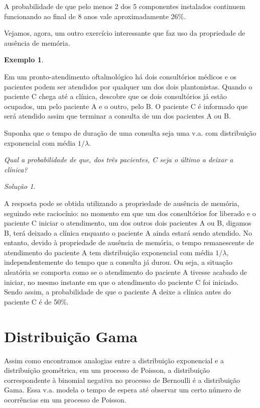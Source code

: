 \documentclass[
]{book}
\theoremstyle{definition}
\theoremstyle{definition}
\newtheorem{example}{Exemplo}[chapter]
\theoremstyle{definition}
\theoremstyle{remark}
\newtheorem*{solution}{Solução}
\begin{document}
A probabilidade de que pelo menos 2 dos 5 componentes instalados continuem funcionando ao final de 8 anos vale aproximadamente 26\%.

Vejamos, agora, um outro exercício interessante que faz uso da propriedade de ausência de memória.

\begin{example}
\protect\hypertarget{exm:unnamed-chunk-7}{}{\label{exm:unnamed-chunk-7} }
\end{example}

Em um pronto-atendimento oftalmológico há dois consultórios médicos e os pacientes podem ser atendidos por qualquer um dos dois plantonistas. Quando o paciente C chega até a clínica, descobre que os dois consultórios já estão ocupados, um pelo paciente A e o outro, pelo B. O paciente C é informado que será atendido assim que terminar a consulta de um dos pacientes A ou B.

Suponha que o tempo de duração de uma consulta seja uma v.a. com distribuição exponencial com média \(1/\lambda\).

\emph{Qual a probabilidade de que, dos três pacientes, C seja o último a deixar a clínica?}

\begin{solution}
{}
\end{solution}

A resposta pode se obtida utilizando a propriedade de ausência de memória, seguindo este raciocínio: no momento em que um dos consultórios for liberado e o paciente C iniciar o atendimento, um dos outros dois pacientes A ou B, digamos B, terá deixado a clínica enquanto o paciente A ainda estará sendo atendido. No entanto, devido à propriedade de ausência de memória, o tempo remanescente de atendimento do paciente A tem distribuição exponencial com média \(1/\lambda\), independentemente do tempo que a consulta já durou. Ou seja, a situação aleatória se comporta como se o atendimento do paciente A tivesse acabado de iniciar, no mesmo instante em que o atendimento do paciente C foi iniciado. Sendo assim, a probabilidade de que o paciente A deixe a clínica antes do paciente C é de 50\%.

\hypertarget{distribuiuxe7uxe3o-gama}{%
\section{Distribuição Gama}\label{distribuiuxe7uxe3o-gama}}

Assim como encontramos analogias entre a distribuição exponencial e a distribuição geométrica, em um processo de Poisson, a distribuição correspondente à binomial negativa no processo de Bernoulli é a distribuição Gama. Essa v.a. modela o tempo de espera até observar um certo número de ocorrências em um processo de Poisson.
\end{document}
